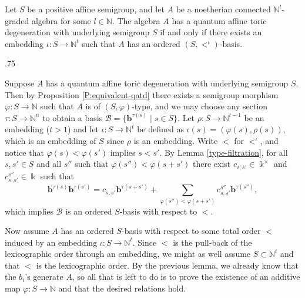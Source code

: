 \documentclass[11pt,fleqn]{article}
\makeatletter
\renewenvironment{proof}[1][\textit{Proof}]{\par
  \pushQED{\qed}%
  \normalfont \topsep.75\paraskip\relax
  \trivlist
  \item[\hskip\labelsep
        \itshape
    #1\@addpunct{.}]\ignorespaces
}{%
  \popQED\endtrivlist\@endpefalse
}
\newcommand\NN{\mathbb N}
\renewcommand\to{\longrightarrow}
\renewcommand\phi{\varphi}
\renewcommand\b{\mathbf b}
\renewcommand\k{\Bbbk}
\makeatother
\begin{document}
\begin{Proposition*}
Let $S$ be a positive affine semigroup, and let $A$ be a noetherian connected 
$\NN^l$-graded algebra for some $l \in \NN$. The algebra $A$ has a quantum 
affine toric degeneration with underlying semigroup $S$ if and only if there 
exists an embedding $\iota: S \to \NN^t$ such that $A$ has an ordered 
$(S, <^\iota)$-basis.
\end{Proposition*}
\begin{proof}
Suppose $A$ has a quantum affine toric degeneration with underlying semigroup 
$S$. Then by Proposition \ref{P:equivalent-qatd} there exists a semigroup 
morphism $\phi: S\to \NN$ such that $A$ is of $(S, \phi)$-type, and we may 
choose any section $\tau: S \to \NN^n$ to obtain a basis $\mathcal B = 
\{\b^{\tau(s)} \mid s \in S\}$. Let $\rho: S \to \NN^{t-1}$ be an embedding 
($t>1$) and let $\iota: S \to \NN^t$ be defined as $\iota(s) = (\phi(s), 
\rho(s))$, which is an embedding of $S$ since $\rho$ is an embedding. Write 
$<$ for $<^\iota$, and notice that $\phi(s) < \phi(s')$ implies $s<s'$. By 
Lemma \ref{type-filtration}, for all $s,s' \in S$ and all $s''$ such that 
$\phi(s'') < \phi(s+s')$ there exist $c_{s,s'} \in \k^\times$ and 
$c_{s,s'}^{s''} \in \k$ such that
\[
  \b^{\tau(s)}\b^{\tau(s')} 
    = c_{s,s'}\b^{\tau(s+s')} 
      + \sum_{\phi(s'') < \phi(s+s')} c_{s,s'}^{s''} \b^{\tau(s'')},
\]
which implies $\mathcal B$ is an ordered $S$-basis with respect to $<$.

Now assume $A$ has an ordered $S$-basis with respect to some total order $<$ 
induced by an embedding $\iota: S \to \NN^t$. Since $<$ is the pull-back of 
the lexicographic order through an embedding, we might as well assume $S 
\subset \NN^t$ and that $<$ is the lexicographic order. By the previous lemma, 
we already know that the $b_i$'s generate $A$, so all that is left to do is to 
prove the existence of an additive map $\phi:S \to \NN$ and that the 
desired relations hold.


\end{proof}
\end{document}
